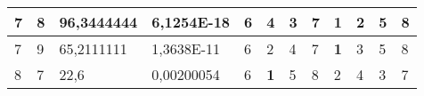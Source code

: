 \documentclass[conference]{IEEEtran}
\begin{document}
\begin{table*}[]
\begin{tabular}{|llll|llllllll|}
\multicolumn{1}{|l|}{7}                                                     & \multicolumn{1}{l|}{8}                                                        & \multicolumn{1}{l|}{96,3444444}                                                   & 6,1254E-18                     & \multicolumn{1}{l|}{6}                                                  & \multicolumn{1}{l|}{4}                                                  & \multicolumn{1}{l|}{3}                                                  & \multicolumn{1}{l|}{7}                                                  & \multicolumn{1}{l|}{\textbf{1}}                                         & \multicolumn{1}{l|}{2}                                                  & \multicolumn{1}{l|}{5}                                                  & 8                          \\ \hline
\multicolumn{1}{|l|}{7}                                                     & \multicolumn{1}{l|}{9}                                                        & \multicolumn{1}{l|}{65,2111111}                                                   & 1,3638E-11                     & \multicolumn{1}{l|}{6}                                                  & \multicolumn{1}{l|}{2}                                                  & \multicolumn{1}{l|}{4}                                                  & \multicolumn{1}{l|}{7}                                                  & \multicolumn{1}{l|}{\textbf{1}}                                         & \multicolumn{1}{l|}{3}                                                  & \multicolumn{1}{l|}{5}                                                  & 8                          \\ \hline
\multicolumn{1}{|l|}{8}                                                     & \multicolumn{1}{l|}{7}                                                        & \multicolumn{1}{l|}{22,6}                                                         & 0,00200054                     & \multicolumn{1}{l|}{6}                                                  & \multicolumn{1}{l|}{\textbf{1}}                                         & \multicolumn{1}{l|}{5}                                                  & \multicolumn{1}{l|}{8}                                                  & \multicolumn{1}{l|}{2}                                                  & \multicolumn{1}{l|}{4}                                                  & \multicolumn{1}{l|}{3}                                                  & 7                          \\ \hline

\end{tabular}
\end{table*}
\end{document}
